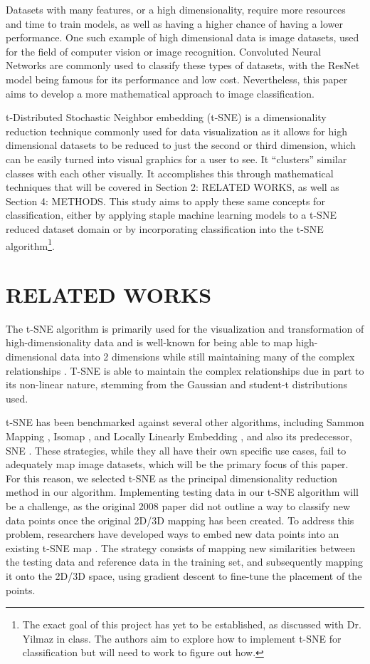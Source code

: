 \documentclass[12pt]{article}
\begin{document}
Datasets with many features, or a high dimensionality, require more resources and time to train models, as well as having a higher chance of having a lower performance. One such example of high dimensional data is image datasets, used for the field of computer vision or image recognition. Convoluted Neural Networks are commonly used to classify these types of datasets, with the ResNet model being famous for its performance and low cost. Nevertheless, this paper aims to develop a more mathematical approach to image classification.

t-Distributed Stochastic Neighbor embedding (t-SNE) is a dimensionality reduction technique commonly used for data visualization as it allows for high dimensional datasets to be reduced to just the second or third dimension, which can be easily turned into visual graphics for a user to see. It “clusters” similar classes with each other visually. It accomplishes this through mathematical techniques that will be covered in Section 2: RELATED WORKS, as well as Section 4: METHODS. This study aims to apply these same concepts for classification, either by applying staple machine learning models to a t-SNE reduced dataset domain or by incorporating classification into the t-SNE algorithm\footnote{ The exact goal of this project has yet to be established, as discussed with Dr. Yilmaz in class. The authors aim to explore how to implement t-SNE for classification but will need to work to figure out how.}.


\section{RELATED WORKS}

The t-SNE algorithm is primarily used for the visualization and transformation of high-dimensionality data and is well-known for being able to map high-dimensional data into 2 dimensions while still maintaining many of the complex relationships \cite{vandermatten2008}. T-SNE is able to maintain the complex relationships due in part to its non-linear nature, stemming from the Gaussian and student-t distributions used.

t-SNE has been benchmarked against several other algorithms, including Sammon Mapping \cite{sammon1969}, Isomap \cite{tenenbaum2000}, and Locally Linearly Embedding \cite{roweis2000}, and also its predecessor, SNE \cite{hinton2002}. These strategies, while they all have their own specific use cases, fail to adequately map image datasets, which will be the primary focus of this paper. For this reason, we selected t-SNE as the principal dimensionality reduction method in our algorithm.
Implementing testing data in our t-SNE algorithm will be a challenge, as the original 2008 paper did not outline a way to classify new data points once the original 2D/3D mapping has been created. To address this problem, researchers have developed ways to embed new data points into an existing t-SNE map \cite{policar2021}. The strategy consists of mapping new similarities between the testing data and reference data in the training set, and subsequently mapping it onto the 2D/3D space, using gradient descent to fine-tune the placement of the points. 
\end{document}
